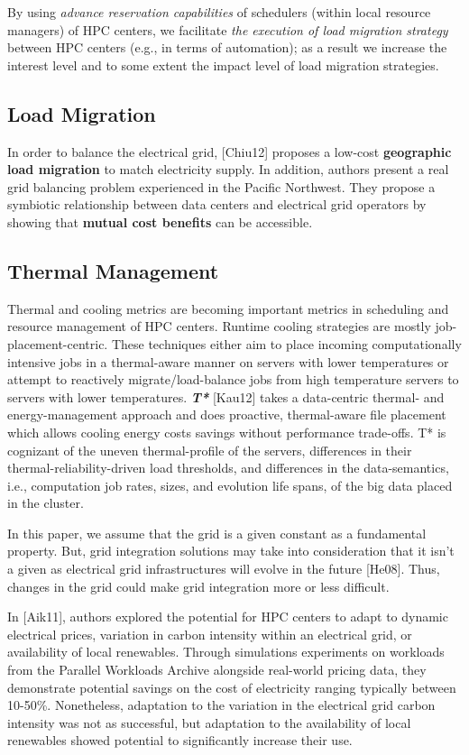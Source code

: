 \documentclass{llncs}
\begin{document}
By using \textit{advance reservation capabilities }of schedulers 
(within local resource managers) of HPC centers, we
facilitate \textit{the execution of load migration strategy }between 
HPC centers (e.g., in terms of automation); as a result
we increase the interest level and to some extent the impact level of load
migration strategies.

\subsection{Load Migration}

In order to balance the electrical grid, [Chiu12] proposes a low-cost
\textbf{geographic load migration} to match electricity supply. In addition,
authors present a real grid balancing problem experienced in the Pacific
Northwest. They propose a symbiotic relationship between data centers and
electrical grid operators by showing that \textbf{mutual cost benefits }can
be accessible.

\subsection{Thermal Management}
Thermal and cooling metrics are becoming important metrics in scheduling and
resource management of HPC centers. Runtime cooling strategies are mostly
job-placement-centric. These techniques either aim to place incoming
computationally intensive jobs in a thermal-aware manner on servers with
lower temperatures or attempt to reactively migrate/load-balance jobs from
high temperature servers to servers with lower temperatures.
\textbf{\textit{T* }}[Kau12] takes a data-centric thermal- and
energy-management approach and does proactive, thermal-aware file placement
which allows cooling energy costs savings without performance trade-offs. T*
is cognizant of the uneven thermal-profile of the servers, differences in
their thermal-reliability-driven load thresholds, and differences in the
data-semantics, i.e., computation job rates, sizes, and evolution life
spans, of the big data placed in the cluster.

In this paper, we assume that the grid is a given constant as a fundamental
property. But, grid integration solutions may take into consideration that
it isn't a given as electrical grid infrastructures will evolve in the
future [He08]. Thus, changes in the grid could make grid integration more or
less difficult.

In [Aik11], authors explored the potential for HPC centers to adapt to
dynamic electrical prices, variation in carbon intensity within an
electrical grid, or availability of local renewables. Through simulations
experiments on workloads from the Parallel Workloads Archive alongside
real-world pricing data, they demonstrate potential savings on the cost of
electricity ranging typically between 10-50{\%}. Nonetheless, adaptation to
the variation in the electrical grid carbon intensity was not as successful,
but adaptation to the availability of local renewables showed potential to
significantly increase their use.
\end{document}
